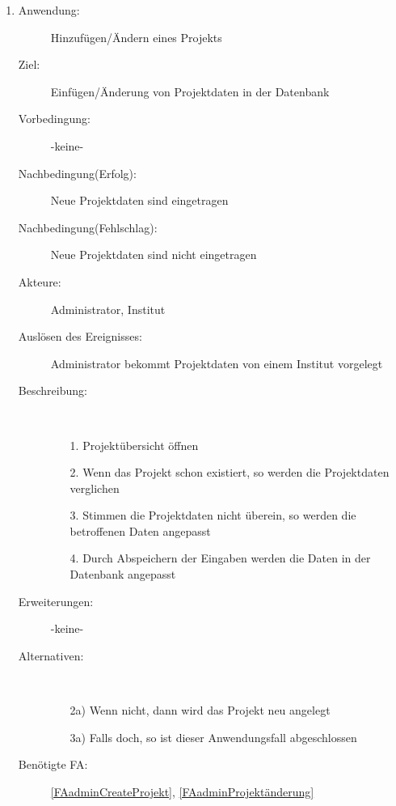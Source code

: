 \documentclass[parskip=full]{scrartcl}
\newcommand{\swtLabel}[1]{\textbf{/#1\arabic*0/}}
\begin{document}
\begin{enumerate} [label=\swtLabel{A}]
  \item \label{UCadminProjektErstellenÄndern}
    \begin{description}
  	\item[Anwendung:] Hinzufügen/Ändern eines Projekts
  	\item[Ziel:] Einfügen/Änderung von Projektdaten in der Datenbank
  	\item[Vorbedingung:] -keine-
  	\item[Nachbedingung(Erfolg):] Neue Projektdaten sind eingetragen
  	\item[Nachbedingung(Fehlschlag):] Neue Projektdaten sind nicht eingetragen
  	\item[Akteure:] Administrator, Institut
  	\item[Auslösen des Ereignisses:] Administrator bekommt Projektdaten von einem
  	Institut vorgelegt
  	\item[Beschreibung:]~
  	\begin{enumerate} 
  	  \item[1.] Projektübersicht öffnen
  	  \item[2.] Wenn das Projekt schon existiert, so werden die Projektdaten
  	  verglichen
  	  \item[3.] Stimmen die Projektdaten nicht überein, so werden die betroffenen
  	  Daten angepasst
  	  \item[4.] Durch Abspeichern der Eingaben werden die Daten in der Datenbank
  	  angepasst
  	\end{enumerate}
  	\item[Erweiterungen:] -keine-
  	\item[Alternativen:]~
  	\begin{enumerate}
  	  \item[2a)] Wenn nicht, dann wird das Projekt neu angelegt
  	  \item[3a)] Falls doch, so ist dieser Anwendungsfall abgeschlossen
  	\end{enumerate} 
  	\item[Benötigte FA:] \ref{FAadminCreateProjekt}, \ref{FAadminProjektänderung}
  \end{description}
   

\end{enumerate}
\end{document}
